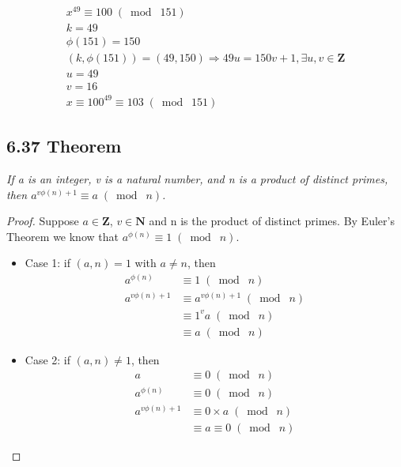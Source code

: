 \documentclass{article}
\begin{document}
\begin{align*}
    &x^{49} \equiv 100 \;(\bmod\; 151)&\\
    &k = 49&\\
    &\phi(151) = 150&\\
    &(k, \phi(151)) = (49, 150) \Longrightarrow 49u = 150v+1 , \exists u, v \in \mathbf{Z}&\\
    &u = 49&\\
    &v = 16&\\
    &x \equiv 100^{49} \equiv 103 \;(\bmod\; 151)&
\end{align*}

\subsection*{6.37 Theorem} 
\quad \textit{If a is an integer, v is a natural number, and n is a product of distinct primes, then $a^{v\phi{(n)}+1} \equiv  a \;(\bmod\; n)$.}

\begin{proof}
Suppose $a \in \mathbf{Z}$, $v \in \mathbf{N}$ and n is the product of distinct primes. By Euler's Theorem we know that $a^{\phi(n)} \equiv 1 \;(\bmod\; n)$.
\begin{itemize}
    \item Case 1: if $(a,n) = 1$ with $a \neq n$, then\\
        \begin{align*}
            &&a^{\phi(n)} &\equiv 1 \;(\bmod\; n)&&\\
            &&a^{v\phi(n)+1} &\equiv a^{v\phi(n)+1} \;(\bmod\; n)&&\\
            && &\equiv 1^{v}a \;(\bmod\; n)&&\\
            && &\equiv a \;(\bmod\; n)&&
        \end{align*}
    \item Case 2: if $(a,n) \neq 1$, then\\
        \begin{align*}
            &&a &\equiv 0 \;(\bmod\; n)&&\\
            &&a^{\phi(n)} &\equiv 0 \;(\bmod\; n)&&\\
            &&a^{v\phi(n)+1} &\equiv 0\times a \;(\bmod\; n)&&\\
            && &\equiv a \equiv 0 \;(\bmod\; n)&&
        \end{align*}
\end{itemize}
\end{proof}
\end{document}
